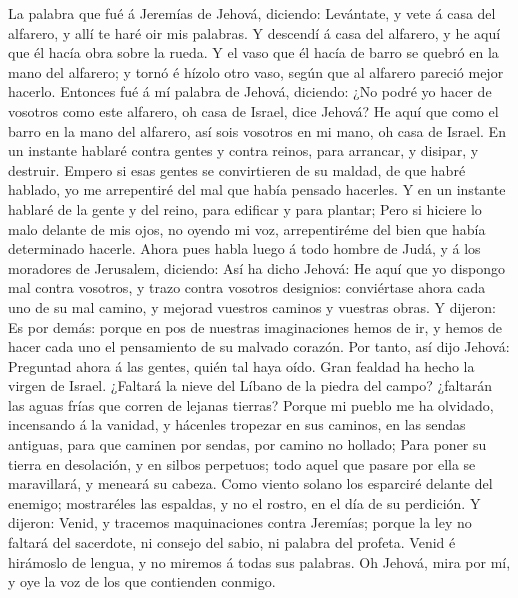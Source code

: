  La palabra que fué á Jeremías de Jehová, diciendo:
 Levántate, y vete á casa del alfarero, y allí te haré oir
mis palabras.  Y descendí á casa del alfarero, y he aquí
que él hacía obra sobre la rueda.  Y el vaso que él hacía
de barro se quebró en la mano del alfarero; y tornó é hízolo otro vaso,
según que al alfarero pareció mejor hacerlo.  Entonces fué
á mí palabra de Jehová, diciendo:  ¿No podré yo hacer de
vosotros como este alfarero, oh casa de Israel, dice Jehová? He aquí que
como el barro en la mano del alfarero, así sois vosotros en mi mano, oh
casa de Israel.  En un instante hablaré contra gentes y
contra reinos, para arrancar, y disipar, y destruir. 
Empero si esas gentes se convirtieren de su maldad, de que habré
hablado, yo me arrepentiré del mal que había pensado hacerles.
 Y en un instante hablaré de la gente y del reino, para
edificar y para plantar;  Pero si hiciere lo malo delante
de mis ojos, no oyendo mi voz, arrepentiréme del bien que había
determinado hacerle.  Ahora pues habla luego á todo
hombre de Judá, y á los moradores de Jerusalem, diciendo: Así ha dicho
Jehová: He aquí que yo dispongo mal contra vosotros, y trazo contra
vosotros designios: conviértase ahora cada uno de su mal camino, y
mejorad vuestros caminos y vuestras obras.  Y dijeron: Es
por demás: porque en pos de nuestras imaginaciones hemos de ir, y hemos
de hacer cada uno el pensamiento de su malvado corazón. 
Por tanto, así dijo Jehová: Preguntad ahora á las gentes, quién tal haya
oído. Gran fealdad ha hecho la virgen de Israel. 
¿Faltará la nieve del Líbano de la piedra del campo? ¿faltarán las aguas
frías que corren de lejanas tierras?  Porque mi pueblo me
ha olvidado, incensando á la vanidad, y hácenles tropezar en sus
caminos, en las sendas antiguas, para que caminen por sendas, por camino
no hollado;  Para poner su tierra en desolación, y en
silbos perpetuos; todo aquel que pasare por ella se maravillará, y
meneará su cabeza.  Como viento solano los esparciré
delante del enemigo; mostraréles las espaldas, y no el rostro, en el día
de su perdición.  Y dijeron: Venid, y tracemos
maquinaciones contra Jeremías; porque la ley no faltará del sacerdote,
ni consejo del sabio, ni palabra del profeta. Venid é hirámoslo de
lengua, y no miremos á todas sus palabras.  Oh Jehová,
mira por mí, y oye la voz de los que contienden conmigo. 
